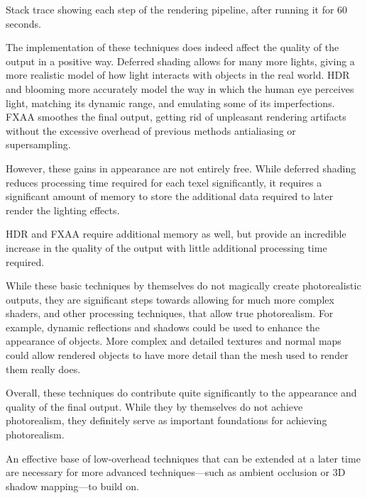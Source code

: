 \documentclass[11pt, oneside]{report}
\begin{document}
\begin{table}[!htbp]
	\caption{Stack trace showing each step of the rendering pipeline, after running it for 60 seconds.}
	\label{tab:booktabs}
\end{table}

The implementation of these techniques does indeed affect the quality of the output in a positive way. Deferred shading allows for many more lights, giving a more realistic model of how light interacts with objects in the real world. \gls{HDR} and blooming more accurately model the way in which the human eye perceives light, matching its dynamic range, and emulating some of its imperfections. \gls{FXAA} smoothes the final output, getting rid of unpleasant rendering artifacts without the excessive overhead of previous methods antialiasing or \gls{supersampling}.

However, these gains in appearance are not entirely free. While deferred shading reduces processing time required for each \gls{texel} significantly, it requires a significant amount of memory to store the additional data required to later render the lighting effects.

\gls{HDR} and \gls{FXAA} require additional memory as well, but provide an incredible increase in the quality of the output with little additional processing time required.

While these basic techniques by themselves do not magically create photorealistic outputs, they are significant steps towards allowing for much more complex shaders, and other processing techniques, that allow true photorealism. For example, dynamic reflections and shadows could be used to enhance the appearance of objects. More complex and detailed textures and normal maps could allow rendered objects to have more detail than the mesh used to render them really does.

Overall, these techniques do contribute quite significantly to the appearance and quality of the final output. While they by themselves do not achieve photorealism, they definitely serve as important foundations for achieving photorealism.

An effective base of low-overhead techniques that can be extended at a later time are necessary for more advanced techniques---such as ambient occlusion or 3D shadow mapping---to build on.
	
\begingroup	
	\setlength\bibitemsep{18pt}

	\printbibliography[
		heading=bibintoc,
		title={Bibliography}
	]
\endgroup

\printglossaries

\begin{landscape}

\end{landscape}
\end{document}
